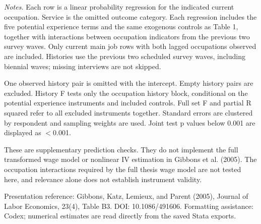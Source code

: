 \documentclass[10pt,letterpaper]{article}
\begin{document}
\medskip
{\footnotesize
\noindent\textit{Notes.} Each row is a linear probability regression for the indicated current occupation. Service is the omitted outcome category. Each regression includes the five potential experience terms and the same exogenous controls as Table 1, together with interactions between occupation indicators from the previous two survey waves. Only current main job rows with both lagged occupations observed are included. Histories use the previous two scheduled survey waves, including biennial waves; missing interviews are not skipped.\par
\smallskip\noindent One observed history pair is omitted with the intercept. Empty history pairs are excluded. History F tests only the occupation history block, conditional on the potential experience instruments and included controls. Full set F and partial R squared refer to all excluded instruments together. Standard errors are clustered by respondent and sampling weights are used. Joint test p values below 0.001 are displayed as $<$0.001.\par
\smallskip\noindent These are supplementary prediction checks. They do not implement the full transformed wage model or nonlinear IV estimation in Gibbons et al. (2005). The occupation interactions required by the full thesis wage model are not tested here, and relevance alone does not establish instrument validity.\par
\smallskip\noindent Presentation reference: Gibbons, Katz, Lemieux, and Parent (2005), Journal of Labor Economics, 23(4), Table B3. DOI: 10.1086/491606. Formatting assistance: Codex; numerical estimates are read directly from the saved Stata exports.\par
}
\end{document}
